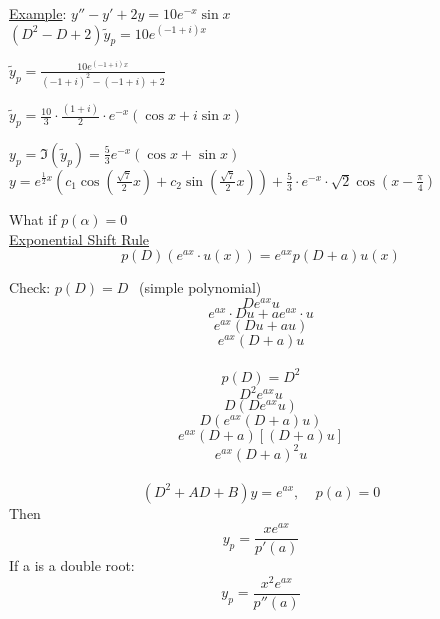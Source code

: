 \documentclass[12pt]{article}
\numberwithin{equation}{subsection}
\newcommand{\sinp}[1]{\sin\left( #1 \right)}
\newcommand{\cosp}[1]{\cos\left( #1 \right)}
\newcommand{\indb}{\hspace{1cm}}
\newcommand{\indd}{\hspace{2cm}}
\newcommand{\exa}{\noindent \underline{Example}: \hspace{1cm}}
\begin{document}
\exa $y''-y'+2y=10e^{-x}\sin x$\\

\indd $(D^2-D+2)\tilde{y}_p=10e^{(-1+i)x}$

\indd $\tilde{y}_p= \frac{10e^{(-1+i)x}}{(-1+i)^2-(-1+i)+2}$

\indd $\tilde{y}_p= \frac{10}{3} \cdot \frac{(1+i)}{2} \cdot e^{-x}(\cos x + i \sin x)$

\indd $y_p= \Im (\tilde{y}_p) = \frac{5}{3}e^{-x}(\cos x + \sin x) $\\

\indb $y=e^{\frac{1}{2}x}\left( c_1\cosp{\frac{\sqrt{7}}{2}x} + c_2\sinp{\frac{\sqrt{7}}{2}x}   \right) + \frac{5}{3}\cdot e^{-x} \cdot \sqrt{2} \cosp{x-\frac{\pi}{4}}$


\newpage

What if $p(\alpha)=0$\\

\noindent \underline{Exponential Shift Rule}
\begin{equation}
p(D)(e^{ax}\cdot u(x))=e^{ax}p(D+a)u(x)
\end{equation}

\noindent Check: $p(D)=D\ \ $ (simple polynomial)
\begin{equation}
De^{ax}u
\end{equation}
\begin{equation}
e^{ax}\cdot Du+ ae^{ax} \cdot u
\end{equation}
\begin{equation}
e^{ax}(Du+au)
\end{equation}
\begin{equation}
e^{ax}(D+a)u
\end{equation}\\


$$ p(D)=D^2$$
\begin{equation}
D^2e^{ax}u
\end{equation}
\begin{equation}
D(De^{ax}u)
\end{equation}
\begin{equation}
D(e^{ax}(D+a)u)
\end{equation}
\begin{equation}
e^{ax}(D+a)[(D+a)u]
\end{equation}
\begin{equation}
e^{ax}(D+a)^2u
\end{equation}\\

\begin{equation}
(D^2+AD+B)y=e^{ax},\ \ \ \ \ p(a)=0
\end{equation}
Then
\begin{equation}
y_p=\frac{xe^{ax}}{p'(a)}
\end{equation}
If a is a double root:
\begin{equation}
y_p=\frac{x^2e^{ax}}{p''(a)}
\end{equation}
\end{document}
